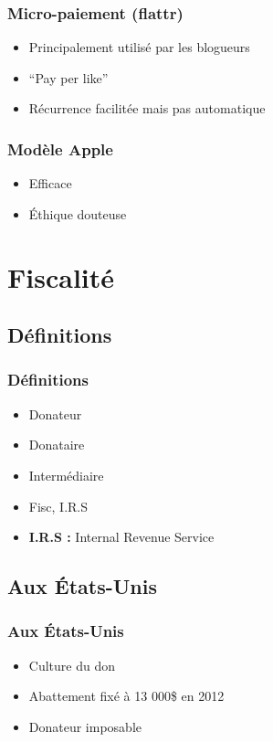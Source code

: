 \begin{frame}
\frametitle{Micro-paiement (flattr)}

\begin{itemize}
    \itemsep1.5em
    \item Principalement utilisé par les blogueurs
    \item ``Pay per like''
    \item Récurrence facilitée mais pas automatique
\end{itemize}
\end{frame}


\begin{frame}
\frametitle{Modèle Apple}

\begin{itemize}
    \itemsep1.5em
    \item Efficace
    \item Éthique douteuse
\end{itemize}
\end{frame}


    \section{Fiscalité}

    \subsection{Définitions}


\begin{frame}
\frametitle{Définitions}

\begin{itemize}
    \itemsep1.5em
    \item Donateur
    \item Donataire
    \item Intermédiaire
    \item Fisc, I.R.S
    \item \textbf{I.R.S :} Internal Revenue Service
\end{itemize}
\end{frame}


    \subsection{Aux États-Unis}

\begin{frame}
\frametitle{Aux États-Unis}

\begin{itemize}
    \itemsep1.5em
    \item Culture du don
    \item Abattement fixé à 13 000\${} en 2012
    \item Donateur imposable
\end{itemize}
\end{frame}


